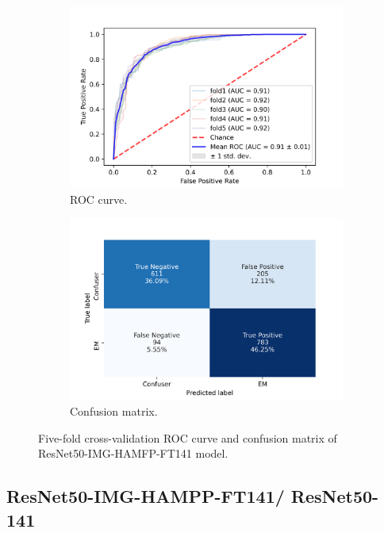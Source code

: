 \begin{figure}[h!]
	\centering
	\begin{subfigure}[b]{0.49\textwidth}
		\centering
		\includegraphics[width=\textwidth,keepaspectratio]{images/Supplement4/image62.png}
		\caption{ROC curve.}
	\end{subfigure}
	\hfill
	\begin{subfigure}[b]{0.49\textwidth}
		\centering
		\includegraphics[width=\textwidth,keepaspectratio]{images/Supplement4/image68.png}
		\caption{Confusion matrix.}
	\end{subfigure}
	\caption{Five-fold cross-validation ROC curve and confusion matrix of ResNet50-IMG-HAMFP-FT141 model.}
\end{figure}

\vfill\clearpage
\subsection{ResNet50-IMG-HAMPP-FT141/ ResNet50-141}

